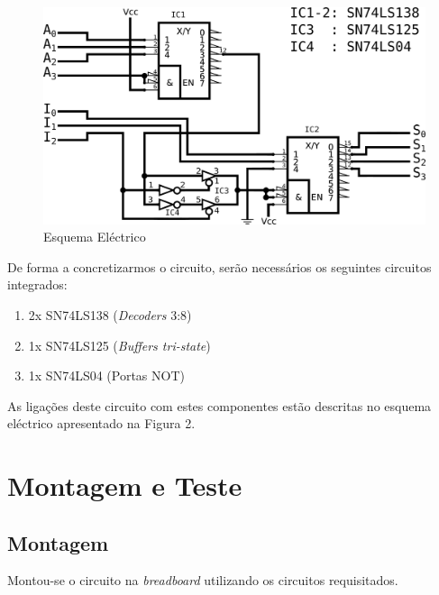 \documentclass[a4paper,12pt]{article}
\begin{document}
\begin{figure}
\centering
\includegraphics[scale=.1]{esqelect.eps}
\caption{Esquema Eléctrico}
\end{figure}
\par

De forma a concretizarmos o circuito, serão necessários os seguintes circuitos integrados:
\begin{enumerate}
    \item 2x SN74LS138 ({\it Decoders} 3:8)
    \item 1x SN74LS125 ({\it Buffers tri-state})
    \item 1x SN74LS04  (Portas NOT)
\end{enumerate}
\par
As ligações deste circuito com estes componentes estão descritas no esquema eléctrico apresentado na Figura 2.
\section{Montagem e Teste}
\subsection{Montagem}
Montou-se o circuito na {\it breadboard} utilizando os circuitos requisitados.

\pagebreak
\end{document}
